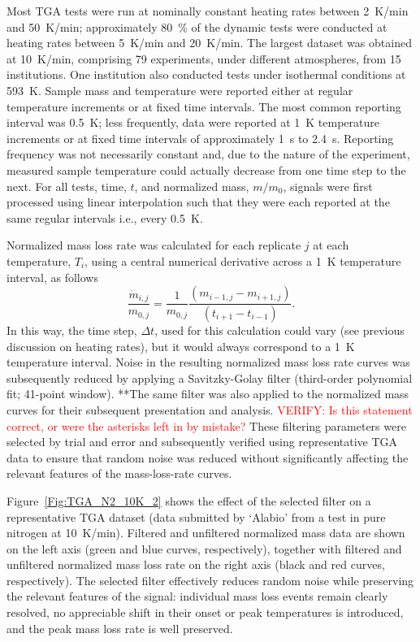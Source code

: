 \documentclass{book}
\begin{document}
Most TGA tests were run at nominally constant heating rates between 2~K/min and 50~K/min; approximately 80~\% of the dynamic tests were conducted at heating rates between 5~K/min and 20~K/min. The largest dataset was obtained at 10~K/min, comprising 79 experiments, under different atmospheres, from 15 institutions. One institution also conducted tests under isothermal conditions at 593~K. Sample mass and temperature were reported either at regular temperature increments or at fixed time intervals. The most common reporting interval was 0.5~K; less frequently, data were reported at 1~K temperature increments or at fixed time intervals of approximately 1~s to 2.4~s. Reporting frequency was not necessarily constant and, due to the nature of the experiment, measured sample temperature could actually decrease from one time step to the next. For all tests, time, $t$, and normalized mass, $m/m_0$, signals were first processed using linear interpolation such that they were each reported at the same regular intervals i.e., every 0.5~K.

Normalized mass loss rate was calculated for each replicate $j$ at each temperature, $T_i$, using a central numerical derivative across a 1~K temperature interval, as follows
\begin{equation}
   \frac{\dot{m}_{i,j}}{m_{0,j}} = \frac{1}{m_{0,j}}\frac{\left(m_{i-1,j}-m_{i+1,j}\right)}{\left(t_{i+1}-t_{i-1}\right)}.
\end{equation}
In this way, the time step, $\Delta t$, used for this calculation could vary (see previous discussion on heating rates), but it would always correspond to a 1~K temperature interval. Noise in the resulting normalized mass loss rate curves was subsequently reduced by applying a Savitzky-Golay filter (third-order polynomial fit; 41-point window). **The same filter was also applied to the normalized mass curves for their subsequent presentation and analysis. \textcolor{red}{VERIFY: Is this statement correct, or were the asterisks left in by mistake?} These filtering parameters were selected by trial and error and subsequently verified using representative TGA data to ensure that random noise was reduced without significantly affecting the relevant features of the mass-loss-rate curves.

Figure~\ref{Fig:TGA_N2_10K_2} shows the effect of the selected filter on a representative TGA dataset (data submitted by ‘Alabio’ from a test in pure nitrogen at 10~K/min). Filtered and unfiltered normalized mass data are shown on the left axis (green and blue curves, respectively), together with filtered and unfiltered normalized mass loss rate on the right axis (black and red curves, respectively). The selected filter effectively reduces random noise while preserving the relevant features of the signal: individual mass loss events remain clearly resolved, no appreciable shift in their onset or peak temperatures is introduced, and the peak mass loss rate is well preserved.
\end{document}
